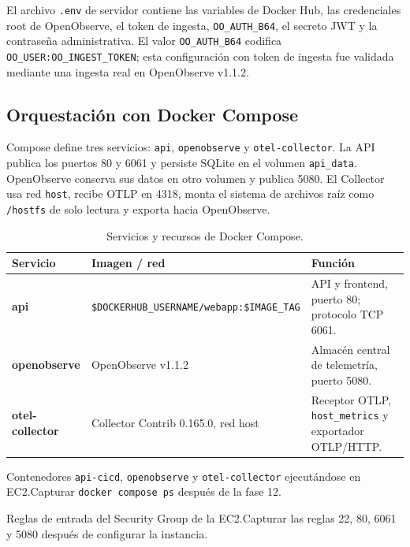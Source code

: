 \documentclass[12pt,a4paper]{article}
\begin{document}
El archivo \texttt{.env} de servidor contiene las variables de Docker Hub, las credenciales root de OpenObserve, el token de ingesta, \texttt{OO\_AUTH\_B64}, el secreto JWT y la contraseña administrativa. El valor \texttt{OO\_AUTH\_B64} codifica \texttt{OO\_USER:OO\_INGEST\_TOKEN}; esta configuración con token de ingesta fue validada mediante una ingesta real en OpenObserve v1.1.2.

\subsection{Orquestación con Docker Compose}

Compose define tres servicios: \texttt{api}, \texttt{openobserve} y \texttt{otel-collector}. La API publica los puertos 80 y 6061 y persiste SQLite en el volumen \texttt{api\_data}. OpenObserve conserva sus datos en otro volumen y publica 5080. El Collector usa red \texttt{host}, recibe OTLP en 4318, monta el sistema de archivos raíz como \texttt{/hostfs} de solo lectura y exporta hacia OpenObserve.

\begin{table}[H]
  \centering
  \caption{Servicios y recursos de Docker Compose.}
  \small
  \begin{tabularx}{\textwidth}{>{\bfseries}p{3.2cm} p{3.1cm} X}
    \toprule
    Servicio & Imagen / red & Función \\
    \midrule
    api & \texttt{\$DOCKERHUB\_USERNAME/webapp:\$IMAGE\_TAG} & API y frontend, puerto 80; protocolo TCP 6061. \\
    openobserve & OpenObserve v1.1.2 & Almacén central de telemetría, puerto 5080. \\
    otel-collector & Collector Contrib 0.165.0, red host & Receptor OTLP, \texttt{host\_metrics} y exportador OTLP/HTTP. \\
    \bottomrule
  \end{tabularx}
\end{table}

\begin{pendingfigure}{Contenedores \texttt{api-cicd}, \texttt{openobserve} y \texttt{otel-collector} ejecutándose en EC2.}{Capturar \texttt{docker compose ps} después de la fase 12.}
\label{fig:dockerps}
\end{pendingfigure}

\begin{pendingfigure}{Reglas de entrada del Security Group de la EC2.}{Capturar las reglas 22, 80, 6061 y 5080 después de configurar la instancia.}
\label{fig:securitygroup}
\end{pendingfigure}
\end{document}
